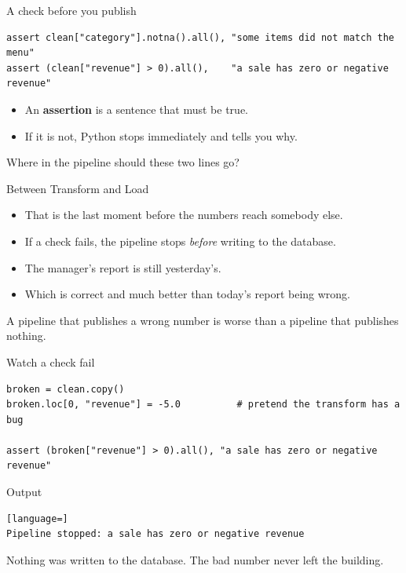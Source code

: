 \documentclass[aspectratio=169,10pt]{beamer}
\newcommand{\Out}{\vspace{-2pt}\textcolor{muted}{\scriptsize\textsf{Output}}\vspace{-4pt}}
\begin{document}
\begin{frame}[fragile]{A check before you publish}
\begin{lstlisting}
assert clean["category"].notna().all(), "some items did not match the menu"
assert (clean["revenue"] > 0).all(),    "a sale has zero or negative revenue"
\end{lstlisting}

  \pause
  \begin{itemize}[<+->]
    \item An \textbf{assertion} is a sentence that must be true.
    \item If it is not, Python stops immediately and tells you why.
  \end{itemize}

  \pause
  \begin{ask}
    \small
    Where in the pipeline should these two lines go?
  \end{ask}
\end{frame}

\begin{frame}{Between Transform and Load}
  \begin{itemize}[<+->]
    \item That is the \alert{last moment} before the numbers reach somebody else.
    \item If a check fails, the pipeline stops \emph{before} writing to the database.
    \item The manager's report is still yesterday's.
    \item Which is correct \textemdash{} and much better than today's report being wrong.
  \end{itemize}

  \pause\vfill
  \begin{prac}
    \small
    A pipeline that publishes a wrong number is worse than a pipeline that publishes nothing.
  \end{prac}
\end{frame}

\begin{frame}[fragile]{Watch a check fail}
\begin{lstlisting}
broken = clean.copy()
broken.loc[0, "revenue"] = -5.0          # pretend the transform has a bug

assert (broken["revenue"] > 0).all(), "a sale has zero or negative revenue"
\end{lstlisting}
  \Out
\begin{lstlisting}[language=]
Pipeline stopped: a sale has zero or negative revenue
\end{lstlisting}

  \pause
  \begin{aside}
    \small
    Nothing was written to the database. The bad number never left the building.
  \end{aside}
\end{frame}
\end{document}
